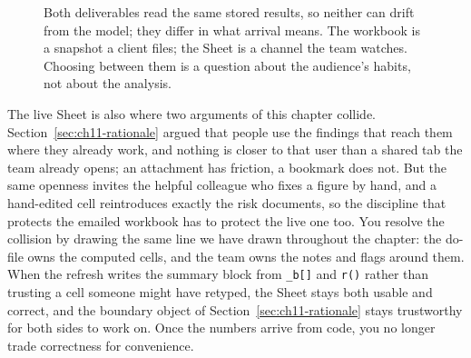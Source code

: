 \documentclass[
    a4paper,
    fontsize=10pt,
    twoside=true,
    numbers=noenddot,
]{kaobook}
\begin{document}
\begin{figure}[htbp]
\centering
{}
\caption[Two delivery surfaces, one source]{Both deliverables read the same stored results, so neither can drift from the model; they differ in what arrival means. The workbook is a snapshot a client files; the Sheet is a channel the team watches. Choosing between them is a question about the audience's habits, not about the analysis.}
\label{fig:ch11-viz-twopaths}
\end{figure}

The live Sheet is also where two arguments of this chapter collide. Section~\ref{sec:ch11-rationale} argued that people use the findings that reach them where they already work, and nothing is closer to that user than a shared tab the team already opens; an attachment has friction, a bookmark does not. But the same openness invites the helpful colleague who fixes a figure by hand, and a hand-edited cell reintroduces exactly the risk \textcite{panko1998errors} documents, so the discipline that protects the emailed workbook has to protect the live one too. You resolve the collision by drawing the same line we have drawn throughout the chapter: the do-file owns the computed cells, and the team owns the notes and flags around them. When the refresh writes the summary block from \texttt{\_b[]} and \texttt{r()} rather than trusting a cell someone might have retyped, the Sheet stays both usable and correct, and the boundary object of Section~\ref{sec:ch11-rationale} stays trustworthy for both sides to work on. Once the numbers arrive from code, you no longer trade correctness for convenience.
\end{document}
